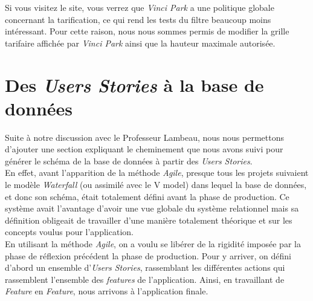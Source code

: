 \documentclass[a4paper,11pt]{article}
\begin{document}
Si vous visitez le site, vous verrez que \emph{Vinci Park} a une politique globale concernant la tarification, ce qui rend les tests du filtre beaucoup moins intéressant.  Pour cette raison, nous nous sommes permis de modifier la grille tarifaire affichée par \emph{Vinci Park} ainsi que la hauteur maximale autorisée.


\section{Des \textit{Users Stories} à la base de données}
Suite à notre discussion avec le Professeur Lambeau, nous nous permettons d'ajouter une section expliquant le cheminement que nous avons suivi pour générer le schéma de la base de données à partir des \textit{Users Stories}.\\

En effet, avant l'apparition de la méthode \emph{Agile}, presque tous les projets suivaient le modèle \emph{Waterfall} (ou assimilé avec le V model) dans lequel la base de données, et donc son schéma, était totalement défini avant la phase de production.  Ce système avait l'avantage d'avoir une vue globale du système relationnel mais sa définition obligeait de travailler d'une manière totalement théorique et sur les concepts voulus pour l'application.\\

En utilisant la méthode \emph{Agile}, on a voulu se libérer de la rigidité imposée par la phase de réflexion précédent la phase  de production.  Pour y arriver, on défini d'abord un ensemble d'\emph{Users Stories}, rassemblant les différentes actions qui rassemblent l'ensemble des \emph{features} de l'application. Ainsi, en travaillant de \emph{Feature} en \emph{Feature}, nous arrivons à l'application finale.\\
\end{document}
